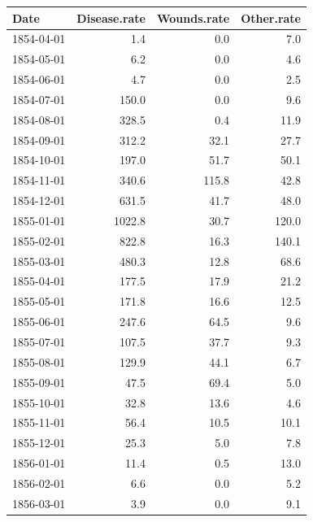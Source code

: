 \documentclass[
]{article}
\newenvironment{Shaded}{\begin{snugshade}}{\end{snugshade}}
\newcommand{\DataTypeTok}[1]{\textcolor[rgb]{0.13,0.29,0.53}{#1}}
\newcommand{\DecValTok}[1]{\textcolor[rgb]{0.00,0.00,0.81}{#1}}
\newcommand{\KeywordTok}[1]{\textcolor[rgb]{0.13,0.29,0.53}{\textbf{#1}}}
\newcommand{\NormalTok}[1]{#1}
\newcommand{\OperatorTok}[1]{\textcolor[rgb]{0.81,0.36,0.00}{\textbf{#1}}}
\newcommand{\OtherTok}[1]{\textcolor[rgb]{0.56,0.35,0.01}{#1}}
\newcommand{\StringTok}[1]{\textcolor[rgb]{0.31,0.60,0.02}{#1}}
\begin{document}
\begin{longtable}[]{@{}lrrr@{}}
\toprule
Date & Disease.rate & Wounds.rate & Other.rate\tabularnewline
\midrule
\endhead
1854-04-01 & 1.4 & 0.0 & 7.0\tabularnewline
1854-05-01 & 6.2 & 0.0 & 4.6\tabularnewline
1854-06-01 & 4.7 & 0.0 & 2.5\tabularnewline
1854-07-01 & 150.0 & 0.0 & 9.6\tabularnewline
1854-08-01 & 328.5 & 0.4 & 11.9\tabularnewline
1854-09-01 & 312.2 & 32.1 & 27.7\tabularnewline
1854-10-01 & 197.0 & 51.7 & 50.1\tabularnewline
1854-11-01 & 340.6 & 115.8 & 42.8\tabularnewline
1854-12-01 & 631.5 & 41.7 & 48.0\tabularnewline
1855-01-01 & 1022.8 & 30.7 & 120.0\tabularnewline
1855-02-01 & 822.8 & 16.3 & 140.1\tabularnewline
1855-03-01 & 480.3 & 12.8 & 68.6\tabularnewline
1855-04-01 & 177.5 & 17.9 & 21.2\tabularnewline
1855-05-01 & 171.8 & 16.6 & 12.5\tabularnewline
1855-06-01 & 247.6 & 64.5 & 9.6\tabularnewline
1855-07-01 & 107.5 & 37.7 & 9.3\tabularnewline
1855-08-01 & 129.9 & 44.1 & 6.7\tabularnewline
1855-09-01 & 47.5 & 69.4 & 5.0\tabularnewline
1855-10-01 & 32.8 & 13.6 & 4.6\tabularnewline
1855-11-01 & 56.4 & 10.5 & 10.1\tabularnewline
1855-12-01 & 25.3 & 5.0 & 7.8\tabularnewline
1856-01-01 & 11.4 & 0.5 & 13.0\tabularnewline
1856-02-01 & 6.6 & 0.0 & 5.2\tabularnewline
1856-03-01 & 3.9 & 0.0 & 9.1\tabularnewline
\bottomrule
\end{longtable}

\begin{Shaded}
\end{Shaded}
\end{document}
